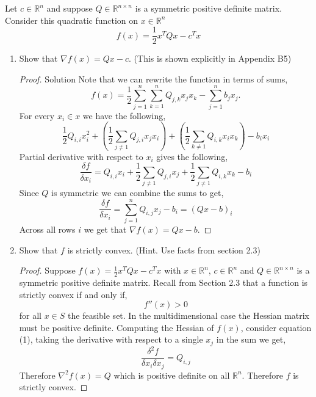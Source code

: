 \documentclass[12pt]{article}
\makeatletter
\theoremstyle{homework}
\newenvironment{exercise}[1]
{\def\@currentlabel{#1}\exercisecore}
{\endexercisecore}
\newcommand{\Reals}{\ensuremath{\mathbb R}}
\let\RR\Reals
\makeatother
\begin{document}
\begin{exercise}{P13} Let $c \in \RR^n$ and suppose $Q \in \RR^{n\times n}$ is a symmetric positive definite matrix. Consider this 
  quadratic function on $x \in \RR^n$
  \begin{equation*}
    f(x) = \frac{1}{2}x^TQx - c^Tx
  \end{equation*}
  \begin{enumerate}
    \item[(a)] Show that $\nabla f(x) = Qx - c$. (This is shown explicitly in Appendix B5)
    \begin{proof}{Solution} Note that we can rewrite the function in terms of sums, 
      \begin{equation*}
        f(x) =\frac{1}{2}\sum_{j = 1}^n\sum_{k = 1}^n Q_{j,k}x_jx_k - \sum_{j = 1}^nb_jx_j. 
      \end{equation*}
      For every $x_i \in x$ we have the following, 
      \begin{equation*}
        \frac{1}{2}Q_{i, i}x_i^2 + \left(\frac{1}{2}\sum_{j \neq 1} Q_{j, i}x_jx_i\right) + \left(\frac{1}{2}\sum_{k \neq 1} Q_{i, k}x_ix_k\right) - b_ix_i 
      \end{equation*}
      Partial derivative with respect to $x_i$ gives the following, 
      \begin{equation*}
        \frac{\delta f}{\delta x_i} = Q_{i, i}x_i + \frac{1}{2}\sum_{j \neq 1} Q_{j, i}x_j + \frac{1}{2}\sum_{j \neq 1} Q_{i, k}x_k - b_i
      \end{equation*}
      Since $Q$ is symmetric we can combine the sums to get, 
      \begin{equation}
        \frac{\delta f}{\delta x_i} = \sum_{j = 1}^n Q_{i, j}x_j - b_i = (Qx - b)_i
      \end{equation}
      Across all rows $i$ we get that $\nabla f(x) = Qx - b$. 
    \end{proof} 
\vspace{.15in}

    \item[(b)] Show that $f$ is strictly convex. (Hint. Use facts from section 2.3)
    \begin{proof} Suppose $f(x) = \frac{1}{2}x^TQx - c^Tx$ with $x \in \RR^n$, $c \in \RR^n$ and $Q \in \RR^{n\times n}$ is a symmetric positive definite matrix.
      Recall from Section 2.3 that a function is strictly convex if and only if, 
      \begin{equation*}
      f''(x) > 0
      \end{equation*}
      for all $x \in S$ the feasible set. In the multidimensional case the Hessian matrix must be positive definite.
      Computing the Hessian of $f(x)$, consider equation (1), taking the derivative with respect to a single $x_j$ in the sum we get, 
      \begin{equation}
        \frac{\delta^2 f}{\delta x_i \delta x_j} = Q_{i, j}
      \end{equation}
      Therefore $\nabla^2 f(x) = Q$ which is positive definite on all $\RR^n$. Therefore $f$ is strictly convex. 
    \end{proof}
\vspace{.15in}



\end{enumerate}
\end{exercise}
\end{document}
